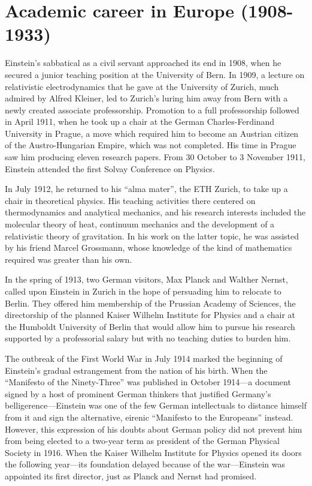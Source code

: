 \documentclass[twoside]{memoir}
\begin{document}
\chapter{Academic career in Europe (1908-1933)}\label{academic-career-in-europe-1908-1933}

Einstein's sabbatical as a civil servant approached its end in 1908, when he secured a junior teaching position at the University of Bern. In 1909, a lecture on relativistic electrodynamics  that he gave at the University of Zurich, much admired by Alfred Kleiner, led to Zurich's luring him away from Bern with a newly created associate professorship.\cite{bG2yp} Promotion to a full professorship followed in April 1911, when he took up a chair at the German Charles-Ferdinand University in Prague, a move which required him to become an Austrian citizen of the Austro-Hungarian Empire, which was not completed. His time in Prague saw him producing eleven research papers. From 30 October to 3 November 1911, Einstein attended the first Solvay Conference on Physics.

In July 1912, he returned to his \enquote{alma mater}, the \acrshort{ETH} Zurich,  to take up a chair in theoretical physics. His teaching activities there centered on thermodynamics and analytical mechanics, and his research interests included the molecular theory of heat, continuum mechanics and the development of a relativistic theory of gravitation. In his work on the latter topic, he was assisted by his friend Marcel Grossmann, whose knowledge of the kind of mathematics required was greater than his own.\cite{hXQin}

In the spring of 1913, two German visitors, Max Planck and Walther Nernst, called upon Einstein in Zurich in the hope of persuading him to relocate to Berlin. They offered him membership of the Prussian Academy of Sciences, the directorship of the planned Kaiser Wilhelm Institute for Physics and a chair at the Humboldt University of Berlin that would allow him to pursue his research supported by a professorial salary but with no teaching duties to burden him.

The outbreak of the First World War in July 1914  marked the beginning of Einstein's gradual estrangement from the nation of his birth. When the \enquote{Manifesto of the Ninety-Three} was published in October 1914---a document signed by a host of prominent German thinkers that justified Germany's belligerence---Einstein was one of the few German intellectuals to distance himself from it and sign the alternative, eirenic \enquote{Manifesto to the Europeans} instead. However, this expression of his doubts about German policy did not prevent him from being elected to a two-year term as president of the German Physical Society in 1916. When the Kaiser Wilhelm Institute for Physics opened its doors the following year---its foundation delayed because of the war---Einstein was appointed its first director, just as Planck and Nernst had promised.\cite{EXcH6}
\end{document}

